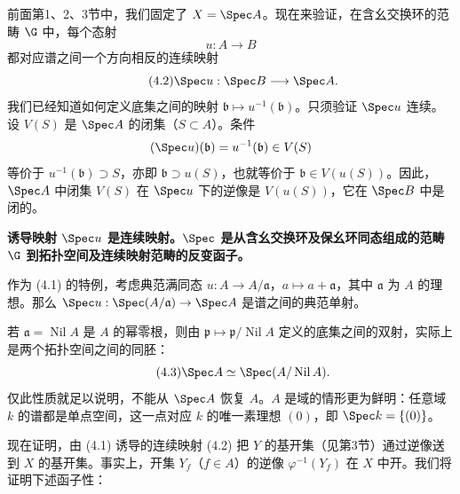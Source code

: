 前面第1、2、3节中，我们固定了 $X=\Spec A$。现在来验证，在含幺交换环的范畴 $\G$ 中，每个态射
\begin{equation}\tag{4.1}
u:A\longrightarrow B
\end{equation}
都对应谱之间一个方向相反的连续映射
\begin{equation}\tag{4.2}
\Spec u:\Spec B\longrightarrow\Spec A.
\end{equation}
我们已经知道如何定义底集之间的映射
$\mathfrak b\mapsto u^{-1}(\mathfrak b)$。只须验证 $\Spec u$ 连续。设 $V(S)$ 是 $\Spec A$ 的闭集（$S\subset A$）。条件
\[
(\Spec u)(\mathfrak b)=u^{-1}(\mathfrak b)\in V(S)
\]
等价于 $u^{-1}(\mathfrak b)\supset S$，亦即 $\mathfrak b\supset u(S)$，也就等价于 $\mathfrak b\in V(u(S))$。因此，$\Spec A$ 中闭集 $V(S)$ 在 $\Spec u$ 下的逆像是 $V(u(S))$，它在 $\Spec B$ 中是闭的。

\textbf{诱导映射 $\Spec u$ 是连续映射。$\Spec$ 是从含幺交换环及保幺环同态组成的范畴 $\G$ 到拓扑空间及连续映射范畴的反变函子。}

作为 (4.1) 的特例，考虑典范满同态 $u:A\to A/\mathfrak a$，$a\mapsto a+\mathfrak a$，其中 $\mathfrak a$ 为 $A$ 的理想。那么 $\Spec u:\Spec(A/\mathfrak a)\to\Spec A$ 是谱之间的典范单射。

若 $\mathfrak a=\operatorname{Nil}A$ 是 $A$ 的幂零根，则由 $\mathfrak p\mapsto\mathfrak p/\operatorname{Nil}A$ 定义的底集之间的双射，实际上是两个拓扑空间之间的同胚：
\begin{equation}\tag{4.3}
\Spec A\simeq\Spec(A/\operatorname{Nil}A).
\end{equation}
仅此性质就足以说明，不能从 $\Spec A$ 恢复 $A$。$A$ 是域的情形更为鲜明：任意域 $k$ 的谱都是单点空间，这一点对应 $k$ 的唯一素理想 $(0)$，即 $\Spec k=\{(0)\}$。

现在证明，由 (4.1) 诱导的连续映射 (4.2) 把 $Y$ 的基开集（见第3节）通过逆像送到 $X$ 的基开集。事实上，开集 $Y_f$（$f\in A$）的逆像 $\varphi^{-1}(Y_f)$ 在 $X$ 中开。我们将证明下述函子性：

